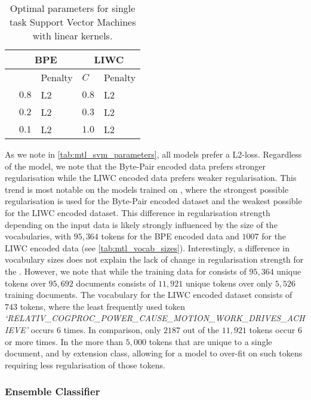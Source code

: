 \begin{table}[]
\centering
\begin{tabular}{l|ll|ll}
                     & \multicolumn{2}{c}{BPE} & \multicolumn{2}{c}{LIWC} \\ \hline
                     &         & Penalty       & $C$      & Penalty       \\ \hline
\cite{Waseem:2016}   & $0.8$   & L2            & $0.8$    & L2            \\
\cite{Davidson:2017} & $0.2$   & L2            & $0.3$    & L2            \\
\cite{Wulczyn:2016}  & $0.1$   & L2            & $1.0$    & L2
\end{tabular}
\caption{Optimal parameters for single task Support Vector Machines with linear kernels.}
\label{tab:mtl_svm_parameters}
\end{table}

As we note in \autoref{tab:mtl_svm_parameters}, all models prefer a L2-loss. Regardless of the model, we note that the Byte-Pair encoded data prefers stronger regularisation while the LIWC encoded data prefers weaker regularisation. This trend is most notable on the models trained on \citet{Wulczyn:2016}, where the strongest possible regularisation is used for the Byte-Pair encoded dataset and the weakest possible for the LIWC encoded dataset. This difference in regularisation strength depending on the input data is likely strongly influenced by the size of the vocabularies, with $95,364$ tokens for the BPE encoded data and $1007$ for the LIWC encoded data (see \autoref{tab:mtl_vocab_sizes}). Interestingly, a difference in vocabulary sizes does not explain the lack of change in regularisation strength for the \citet{Waseem:2016}. However, we note that while the training data for \citet{Wulczyn:2016} consists of $95,364$ unique tokens over $95,692$ documents \citet{Waseem:2016} consists of $11,921$ unique tokens over only $5,526$ training documents. The vocabulary for the LIWC encoded \citet{Waseem:2016} dataset consists of $743$ tokens, where the least frequently used token \textit{`RELATIV\_COGPROC\_POWER\_CAUSE\_MOTION\_WORK\_DRIVES\_ACHIEVE'} occurs $6$ times. In comparison, only $2187$ out of the $11,921$ tokens occur $6$ or more times. In the more than $5,000$ tokens that are unique to a single document, and by extension class, allowing for a model to over-fit on such tokens requiring less regularisation of those tokens.

\subsubsection{Ensemble Classifier}

